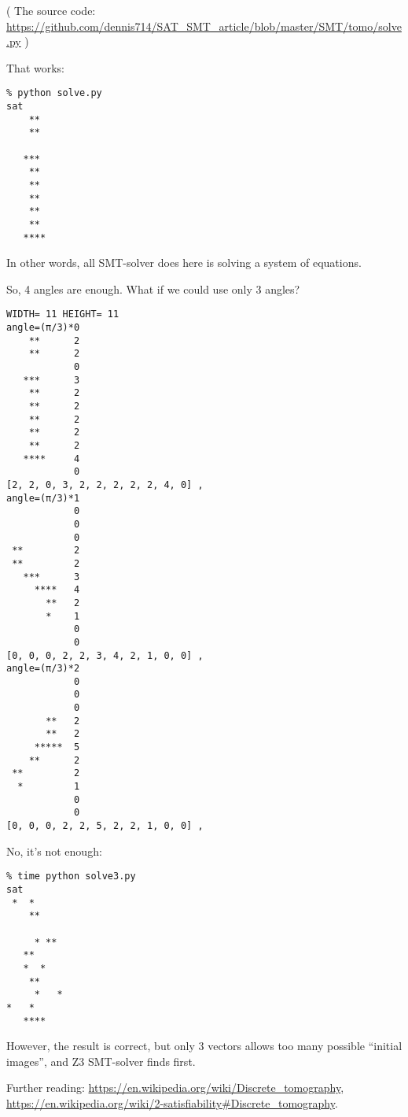 ( The source code: \url{https://github.com/dennis714/SAT_SMT_article/blob/master/SMT/tomo/solve.py} )

That works:

\begin{lstlisting}
% python solve.py
sat
    **
    **

   ***
    **
    **
    **
    **
    **
   ****
\end{lstlisting}

In other words, all SMT-solver does here is solving a system of equations.

So, 4 angles are enough.
What if we could use only 3 angles?

\begin{lstlisting}
WIDTH= 11 HEIGHT= 11
angle=(π/3)*0
    **      2
    **      2
            0
   ***      3
    **      2
    **      2
    **      2
    **      2
    **      2
   ****     4
            0
[2, 2, 0, 3, 2, 2, 2, 2, 2, 4, 0] ,
angle=(π/3)*1
            0
            0
            0
 **         2
 **         2
   ***      3
     ****   4
       **   2
       *    1
            0
            0
[0, 0, 0, 2, 2, 3, 4, 2, 1, 0, 0] ,
angle=(π/3)*2
            0
            0
            0
       **   2
       **   2
     *****  5
    **      2
 **         2
  *         1
            0
            0
[0, 0, 0, 2, 2, 5, 2, 2, 1, 0, 0] ,
\end{lstlisting}

No, it's not enough:

\begin{lstlisting}
% time python solve3.py
sat
 *  *
    **

     * **
   **
   *  *
    **
     *   *
*   *
   ****
\end{lstlisting}

However, the result is correct, but only 3 vectors allows too many possible ``initial images'',
and Z3 SMT-solver finds first.

Further reading:
\url{https://en.wikipedia.org/wiki/Discrete_tomography},
\url{https://en.wikipedia.org/wiki/2-satisfiability#Discrete_tomography}.

